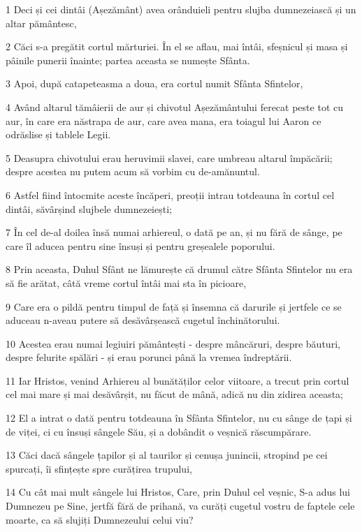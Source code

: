 \par 1 Deci și cei dintâi (Așezământ) avea orânduieli pentru slujba dumnezeiască și un altar pământesc,
\par 2 Căci s-a pregătit cortul mărturiei. În el se aflau, mai întâi, sfeșnicul și masa și pâinile punerii înainte; partea aceasta se numește Sfânta.
\par 3 Apoi, după catapeteasma a doua, era cortul numit Sfânta Sfintelor,
\par 4 Având altarul tămâierii de aur și chivotul Așezământului ferecat peste tot cu aur, în care era năstrapa de aur, care avea mana, era toiagul lui Aaron ce odrăslise și tablele Legii.
\par 5 Deasupra chivotului erau heruvimii slavei, care umbreau altarul împăcării; despre acestea nu putem acum să vorbim cu de-amănuntul.
\par 6 Astfel fiind întocmite aceste încăperi, preoții intrau totdeauna în cortul cel dintâi, săvârșind slujbele dumnezeiești;
\par 7 În cel de-al doilea însă numai arhiereul, o dată pe an, și nu fără de sânge, pe care îl aducea pentru sine însuși și pentru greșealele poporului.
\par 8 Prin aceasta, Duhul Sfânt ne lămurește că drumul către Sfânta Sfintelor nu era să fie arătat, câtă vreme cortul întâi mai sta în picioare,
\par 9 Care era o pildă pentru timpul de față și însemna că darurile și jertfele ce se aduceau n-aveau putere să desăvârșească cugetul închinătorului.
\par 10 Acestea erau numai legiuiri pământești - despre mâncăruri, despre băuturi, despre felurite spălări - și erau porunci până la vremea îndreptării.
\par 11 Iar Hristos, venind Arhiereu al bunătăților celor viitoare, a trecut prin cortul cel mai mare și mai desăvârșit, nu făcut de mână, adică nu din zidirea aceasta;
\par 12 El a intrat o dată pentru totdeauna în Sfânta Sfintelor, nu cu sânge de țapi și de viței, ci cu însuși sângele Său, și a dobândit o veșnică răscumpărare.
\par 13 Căci dacă sângele țapilor și al taurilor și cenușa junincii, stropind pe cei spurcați, îi sfințește spre curățirea trupului,
\par 14 Cu cât mai mult sângele lui Hristos, Care, prin Duhul cel veșnic, S-a adus lui Dumnezeu pe Sine, jertfă fără de prihană, va curăți cugetul vostru de faptele cele moarte, ca să slujiți Dumnezeului celui viu?
